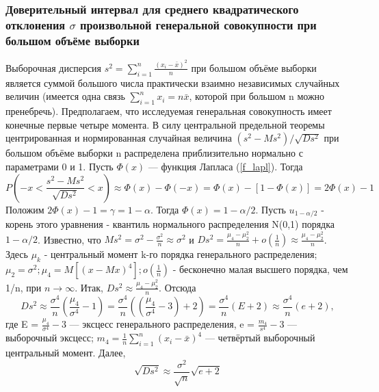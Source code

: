 \documentclass[12pt,a4paper]{scrartcl}
\begin{document}
\subsubsection{Доверительный интервал для среднего квадратического отклонения $\sigma$ произвольной генеральной совокупности при большом объёме выборки}

    Выборочная дисперсия $s^{2} = \sum_{i = 1}^{n}{\frac{(x_{i} - \bar{x})^{2}}{n}}$ при большом объёме выборки является суммой большого числа практически взаимно независимых случайных величин (имеется одна связь $\sum_{i=1}^{n}{x_{i}} = n\bar{x}$, которой при большом n можно пренебречь). Предполагаем, что исследуемая генеральная совокупность имеет конечные первые четыре момента.
    \newline
    В силу центральной предельной теоремы центрированная и нормированная случайная величина $(s^{2}-Ms^{2})/\sqrt{Ds^{2}}$ при большом объёме выборки n распределена приблизительно нормально с параметрами 0 и 1. Пусть $\Phi(x)$ — функция Лапласа (\ref{f_lapl}). Тогда
    \begin{equation}
        P\left(-x < \frac{s^{2}-Ms^{2}}{\sqrt{Ds^{2}}} < x\right)
        \approx \Phi(x) - \Phi(-x)=\Phi(x) - [1 - \Phi(x)] = 2\Phi(x) - 1
        \label{P_as_sigma}
    \end{equation}
Положим $2\Phi(x)-1 = \gamma = 1-\alpha$. Тогда $\Phi(x) = 1-\alpha/2$. Пусть $u_{1-\alpha/2}$ - корень этого уравнения - квантиль нормального распределения N(0,1) порядка $1-\alpha/2$. Известно, что $Ms^{2} = \sigma^{2} -\frac{\sigma^2}{n} \approx \sigma^{2}$ и $ Ds^{2} = \frac{\mu_{4} -\mu_{2}^{2}}{n} + o(\frac{1}{n}) \approx \frac{\mu_{4} -\mu_{2}^{2}}{n}$. Здесь $\mu_{k}$ - центральный момент k-го порядка генерального распределения; $\mu_2 = \sigma^2; \mu_4 = M[(x - Mx)^4]; o( \frac{1}{n} )$ - бесконечно малая высшего порядка, чем 1/n, при $n\rightarrow \infty$. Итак, $Ds^{2} \approx \frac{\mu_{4} -\mu_{2}^{2}}{n}$. Отсюда
    \begin{equation}
        Ds^{2} \approx \frac{\sigma^{4}}{n}(\frac{\mu_{4}}{\sigma^{4}} - 1) = 
        \frac{\sigma^{4}}{n}((\frac{\mu_{4}}{\sigma^{4}} - 3) + 2) = \frac{\sigma^{4}}{n}(E + 2) \approx \frac{\sigma^{4}}{n}(e + 2),
        \label{Ds_2}
    \end{equation}
    где E = $\frac{\mu_{4}}{\sigma^{4}} - 3$ — эксцесс генерального распределения, e = $\frac{m_{4}}{s^{4}} - 3$ — выборочный эксцесс; $m_{4} = \frac{1}{n}\sum_{i =1}^{n}{(x_{i} - \bar{x})^{4}}$  — четвёртый выборочный центральный момент. Далее,
    \begin{equation}
        \sqrt{Ds^{2}} \approx \frac{\sigma^{2}}{\sqrt{n}}\sqrt{e + 2}
        \label{sqrt_Ds}
    \end{equation}
\end{document}
